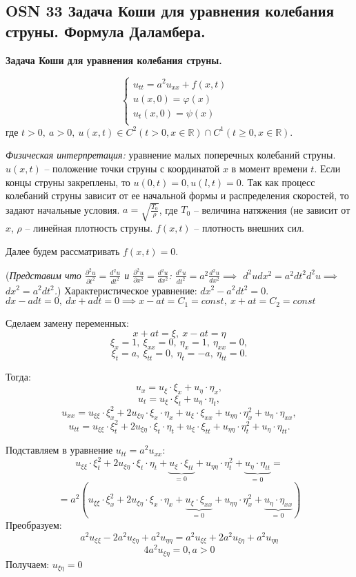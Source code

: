 \subsection*{OSN 33 Задача Коши для уравнения колебания струны. Формула Даламбера.}

\textbf{Задача Коши для уравнения колебания струны.}

$$\begin{cases}
u_{tt}=a^2u_{xx}+f(x,t)&\\
u(x,0)=\varphi(x)&\\
u_t(x,0)=\psi(x)&\\
\end{cases}$$ где $t>0,~a>0,~u(x,t)\in C^2(t > 0, x\in \mathbb{R})\cap C^1(t \geqslant 0, x\in \mathbb{R})$.

\bigbreak
\textit{Физическая интерпретация:} уравнение малых поперечных колебаний струны. $u(x,t)$ -- положение точки струны с координатой $x$ в момент времени $t$. Если концы струны закреплены, то $u(0,t)=0, u(l,t)=0$. Так как процесс колебаний струны зависит от ее начальной формы и распределения скоростей, то задают начальные условия. $a = \sqrt{\frac{T_0}{\rho}}$, где $T_0$ -- величина натяжения (не зависит от $x$, $\rho$ -- линейная плотность струны. $f(x,t)$ -- плотность внешних сил.

\bigbreak
Далее будем рассматривать $f(x,t) = 0$.
\bigbreak

(\textit{Представим что $\frac{\partial^2u}{\partial t^2} = \frac{d^2u}{dt^2}$ и $\frac{\partial^2u}{\partial x^2} = \frac{d^2u}{dx^2}$:
$\frac{d^2u}{dt^2} = a^2\frac{d^2u}{dx^2} \implies$
${d^2udx^2 = a^2dt^2d^2u} \implies$
${dx^2 = a^2dt^2}$.})
Характеристическое уравнение: $dx^2-a^2dt^2=0$. \\
$dx - adt=0, ~ dx+adt = 0 \implies x-at=C_1 = const, ~ x+at=C_2 = const$

Сделаем замену переменных: $$x+at=\xi,~x-at=\eta$$
$$\xi_x=1, ~ \xi_{xx}=0, ~ \eta_x = 1,  ~ \eta_{xx} = 0,$$
$$\xi_t=a, ~ \xi_{tt}=0, ~ \eta_t = -a, ~ \eta_{tt} = 0.$$

Тогда:
$$u_x=u_{\xi}\cdot\xi_x+u_{\eta}\cdot\eta_x,$$
$$u_t=u_{\xi}\cdot\xi_t+u_{\eta}\cdot\eta_t,$$
$$u_{xx}=u_{\xi\xi}\cdot\xi_x^2+2u_{\xi\eta}\cdot\xi_x\cdot\eta_x+u_{\xi}\cdot\xi_{xx}+u_{\eta\eta}\cdot\eta_x^2+u_{\eta}\cdot\eta_{xx},$$
$$u_{tt}=u_{\xi\xi}\cdot\xi_t^2+2u_{\xi\eta}\cdot\xi_t\cdot\eta_t+u_{\xi}\cdot\xi_{tt}+u_{\eta\eta}\cdot\eta_t^2+u_{\eta}\cdot\eta_{tt}.$$

Подставляем в уравнение $u_{tt}=a^2u_{xx}$:
$$u_{\xi\xi}\cdot\xi_t^2+2u_{\xi\eta}\cdot\xi_t\cdot\eta_t+\displaystyle\underbrace{u_{\xi}\cdot\xi_{tt}}_{\text{= 0}}+u_{\eta\eta}\cdot\eta_t^2+\displaystyle\underbrace{u_{\eta}\cdot\eta_{tt}}_{\text{= 0}}=$$ $$=a^2(u_{\xi\xi}\cdot\xi_x^2+2u_{\xi\eta}\cdot\xi_x\cdot\eta_x+\displaystyle\underbrace{u_{\xi}\cdot\xi_{xx}}_{\text{= 0}}+u_{\eta\eta}\cdot\eta_x^2+\displaystyle\underbrace{u_{\eta}\cdot\eta_{xx}}_{\text{= 0}})$$
Преобразуем:
$$a^2u_{\xi\xi}-2a^2u_{\xi\eta}+a^2u_{\eta\eta}=a^2u_{\xi\xi}+2a^2u_{\xi\eta}+a^2u_{\eta\eta}$$
$$4a^2u_{\xi\eta}=0,   a>0$$
Получаем: $u_{\xi\eta}=0$

